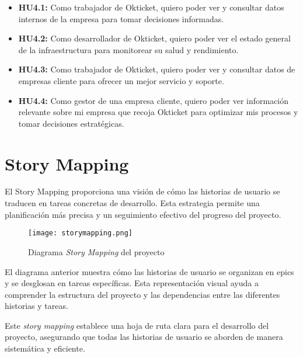 \begin{itemize}
    \item \textbf{HU4.1:} Como trabajador de Okticket, quiero poder ver y
    consultar datos internos de la empresa para tomar decisiones informadas.
    \item \textbf{HU4.2:} Como desarrollador de Okticket, quiero poder ver el
    estado general de la infraestructura para monitorear su salud y rendimiento.
    \item \textbf{HU4.3:} Como trabajador de Okticket, quiero poder ver y
    consultar datos de empresas cliente para ofrecer un mejor servicio y
    soporte.
    \item \textbf{HU4.4:} Como gestor de una empresa cliente, quiero poder ver
    información relevante sobre mi empresa que recoja Okticket para optimizar
    mis procesos y tomar decisiones estratégicas.
\end{itemize}


\newpage{}
\section{Story Mapping}
El Story Mapping proporciona una visión de cómo las historias de usuario se
traducen en tareas concretas de desarrollo. Esta estrategia permite una
planificación más precisa y un seguimiento efectivo del progreso del proyecto.

\begin{figure}[h]
	\centering
	\texttt{[image: storymapping.png]}
	\caption{Diagrama \textit{Story Mapping} del proyecto}
	\label{fig:story_mapping}
\end{figure}

El diagrama anterior muestra cómo las historias de usuario se organizan en
epics y se desglosan en tareas específicas. Esta representación visual ayuda a
comprender la estructura del proyecto y las dependencias entre las diferentes
historias y tareas.

Este \textit{story mapping} establece una hoja de ruta clara para el desarrollo
del proyecto, asegurando que todas las historias de usuario se aborden de manera
sistemática y eficiente.
